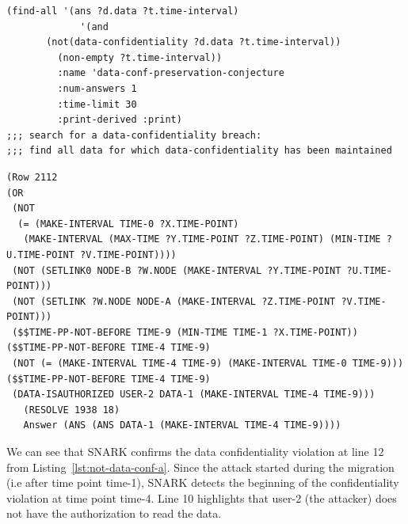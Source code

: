 \begin{lstlisting}[caption=SNARK question to detect the data confidentiality violation., label=lst:not-data-conf-q] 
   (find-all '(ans ?d.data ?t.time-interval)
             '(and
       (not(data-confidentiality ?d.data ?t.time-interval))
         (non-empty ?t.time-interval))
         :name 'data-conf-preservation-conjecture
         :num-answers 1
         :time-limit 30
         :print-derived :print)
;;; search for a data-confidentiality breach:
;;; find all data for which data-confidentiality has been maintained

\end{lstlisting}
\begin{lstlisting}[caption=SNARK detecting the data confidentiality violation., label=lst:not-data-conf-a] 
(Row 2112  
(OR
 (NOT
  (= (MAKE-INTERVAL TIME-0 ?X.TIME-POINT)
   (MAKE-INTERVAL (MAX-TIME ?Y.TIME-POINT ?Z.TIME-POINT) (MIN-TIME ?U.TIME-POINT ?V.TIME-POINT))))
 (NOT (SETLINK0 NODE-B ?W.NODE (MAKE-INTERVAL ?Y.TIME-POINT ?U.TIME-POINT)))
 (NOT (SETLINK ?W.NODE NODE-A (MAKE-INTERVAL ?Z.TIME-POINT ?V.TIME-POINT)))
 ($$TIME-PP-NOT-BEFORE TIME-9 (MIN-TIME TIME-1 ?X.TIME-POINT)) ($$TIME-PP-NOT-BEFORE TIME-4 TIME-9)
 (NOT (= (MAKE-INTERVAL TIME-4 TIME-9) (MAKE-INTERVAL TIME-0 TIME-9))) ($$TIME-PP-NOT-BEFORE TIME-4 TIME-9)
 (DATA-ISAUTHORIZED USER-2 DATA-1 (MAKE-INTERVAL TIME-4 TIME-9)))
   (RESOLVE 1938 18)
   Answer (ANS (ANS DATA-1 (MAKE-INTERVAL TIME-4 TIME-9)))) 
\end{lstlisting}
We can see that SNARK confirms the data confidentiality violation at line 12 from Listing~\ref{lst:not-data-conf-a}.
Since the attack started during the migration (i.e after time point time-1), SNARK detects the beginning of the confidentiality violation at time point time-4.
Line 10 highlights that user-2 (\ie the attacker) does not have the authorization to read the data.

